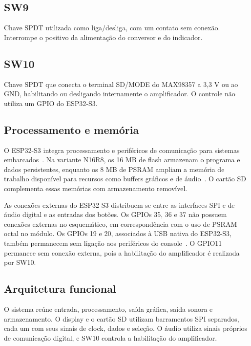 \documentclass[12pt,a4paper]{article}
\begin{document}
\subsection{SW9}
Chave SPDT utilizada como liga/desliga, com um contato sem conexão. Interrompe o positivo da alimentação do conversor e do indicador.

\subsection{SW10}
Chave SPDT que conecta o terminal SD/MODE do MAX98357 a 3,3 V ou ao GND, habilitando ou desligando internamente o amplificador. O controle não utiliza um GPIO do ESP32-S3.

\subsection{Processamento e memória}
O ESP32-S3 integra processamento e periféricos de comunicação para sistemas embarcados~\cite{s3}. Na variante N16R8, os 16 MB de flash armazenam o programa e dados persistentes, enquanto os 8 MB de PSRAM ampliam a memória de trabalho disponível para recursos como buffers gráficos e de áudio~\cite{wroom}. O cartão SD complementa essas memórias com armazenamento removível.

As conexões externas do ESP32-S3 distribuem-se entre as interfaces SPI e de áudio digital e as entradas dos botões. Os GPIOs 35, 36 e 37 não possuem conexões externas no esquemático, em correspondência com o uso de PSRAM octal no módulo. Os GPIOs 19 e 20, associados à USB nativa do ESP32-S3, também permanecem sem ligação aos periféricos do console~\cite{s3,wroom}. O GPIO11 permanece sem conexão externa, pois a habilitação do amplificador é realizada por SW10.

\subsection{Arquitetura funcional}
\begin{center}
\end{center}
O sistema reúne entrada, processamento, saída gráfica, saída sonora e armazenamento. O display e o cartão SD utilizam barramentos SPI separados, cada um com seus sinais de clock, dados e seleção. O áudio utiliza sinais próprios de comunicação digital, e SW10 controla a habilitação do amplificador.
\end{document}
